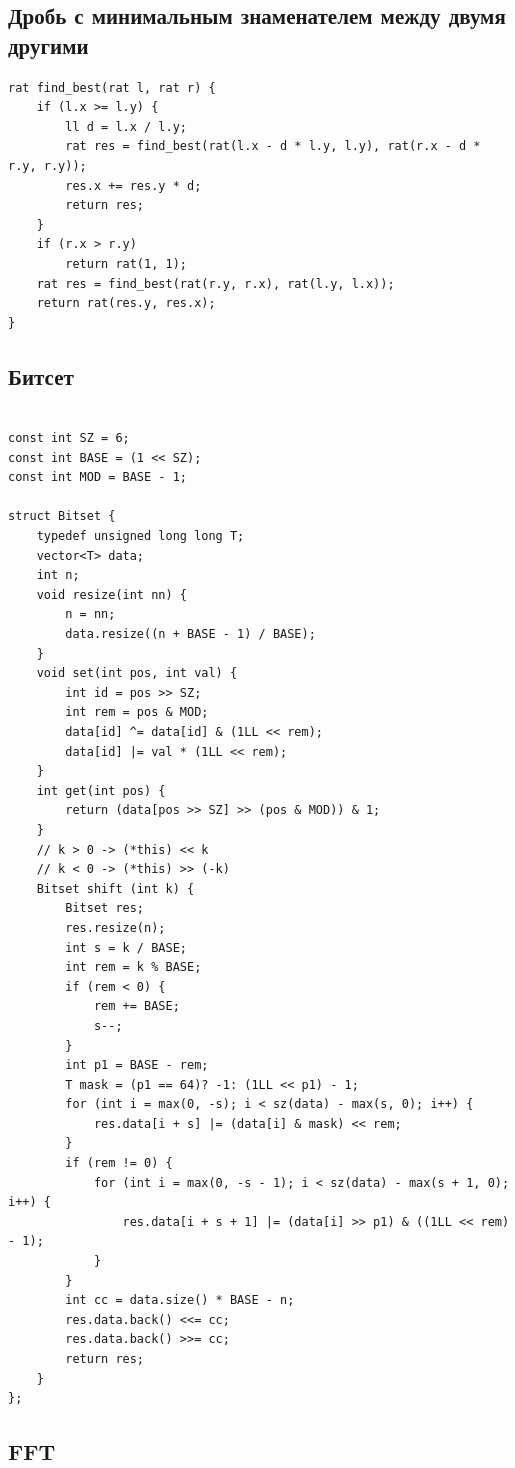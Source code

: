 \documentclass[10pt, portrait,letterpaper]{article}
\begin{document}
\subsection{Дробь с минимальным знаменателем между двумя другими}
\begin{verbatim}
rat find_best(rat l, rat r) {
    if (l.x >= l.y) {
        ll d = l.x / l.y;
        rat res = find_best(rat(l.x - d * l.y, l.y), rat(r.x - d * r.y, r.y));
        res.x += res.y * d;
        return res;
    }
    if (r.x > r.y)
        return rat(1, 1);
    rat res = find_best(rat(r.y, r.x), rat(l.y, l.x));
    return rat(res.y, res.x);
}
\end{verbatim}

\subsection{Битсет}
\begin{verbatim}

const int SZ = 6;
const int BASE = (1 << SZ);
const int MOD = BASE - 1;

struct Bitset {
    typedef unsigned long long T;
    vector<T> data;
    int n;
    void resize(int nn) {
        n = nn;
        data.resize((n + BASE - 1) / BASE);
    }
    void set(int pos, int val) {
        int id = pos >> SZ;
        int rem = pos & MOD;
        data[id] ^= data[id] & (1LL << rem);
        data[id] |= val * (1LL << rem);
    } 
    int get(int pos) {
        return (data[pos >> SZ] >> (pos & MOD)) & 1;
    }
    // k > 0 -> (*this) << k 
    // k < 0 -> (*this) >> (-k)
    Bitset shift (int k) { 
        Bitset res;
        res.resize(n);
        int s = k / BASE;
        int rem = k % BASE;
        if (rem < 0) {
            rem += BASE;
            s--;
        }
        int p1 = BASE - rem;
        T mask = (p1 == 64)? -1: (1LL << p1) - 1;
        for (int i = max(0, -s); i < sz(data) - max(s, 0); i++) {
            res.data[i + s] |= (data[i] & mask) << rem;
        }
        if (rem != 0) {
            for (int i = max(0, -s - 1); i < sz(data) - max(s + 1, 0); i++) {
                res.data[i + s + 1] |= (data[i] >> p1) & ((1LL << rem) - 1);
            }
        }
        int cc = data.size() * BASE - n;
        res.data.back() <<= cc;
        res.data.back() >>= cc;
        return res;
    }
};
\end{verbatim}

\subsection{FFT}
\end{document}
